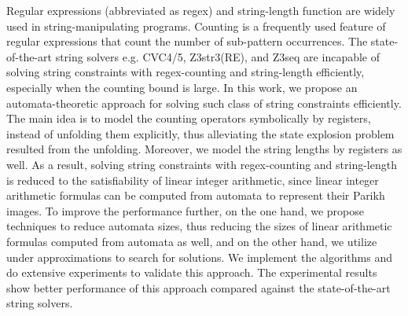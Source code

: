 \documentclass{standalone}
\begin{document}
Regular expressions (abbreviated as regex) and string-length function are widely used in string-manipulating programs. 
Counting is a frequently used feature of regular expressions that count the number of sub-pattern occurrences. The state-of-the-art string solvers e.g. CVC4/5, Z3str3(RE), and Z3seq are incapable of solving string constraints with regex-counting and string-length efficiently, especially when the counting bound is large. In this work, we propose an automata-theoretic approach for solving such class of string constraints efficiently. 
%
The main idea is to model the counting operators symbolically by registers, instead of unfolding them explicitly, thus alleviating the state explosion problem resulted from the unfolding.  
%
Moreover, we model the string lengths by registers as well. As a result, solving string constraints with regex-counting and string-length is reduced to the satisfiability of linear integer arithmetic, since linear integer arithmetic formulas can be computed from automata to represent their Parikh images. 
%
%
To improve the performance further, on the one hand, we propose techniques to reduce automata sizes, thus reducing the sizes of linear arithmetic formulas computed from automata as well, and on the other hand, we utilize under approximations to search for solutions.   
We implement the algorithms and do extensive experiments to validate this approach. The experimental results show better performance of this approach compared against the state-of-the-art string solvers.



\end{document}
